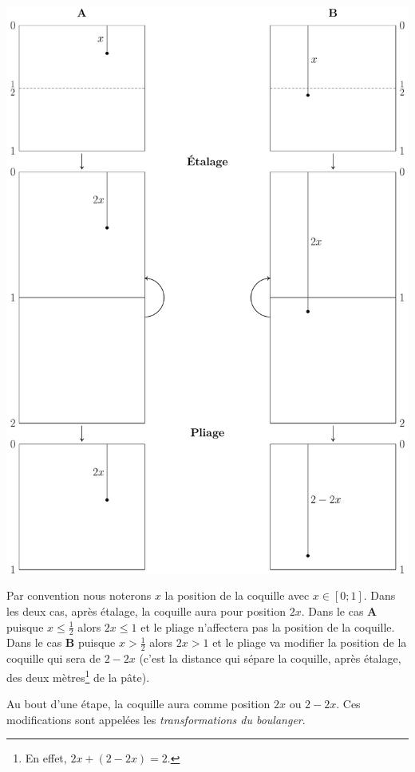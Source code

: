\documentclass[a4paper,french,12pt]{article}
\begin{document}
\begin{center}
\includegraphics[scale=0.45]{../TeXGraph/Pdf/visuel_2D_pate.pdf}
\end{center}

Par convention nous noterons $x$ la position de la coquille avec $x\in\left[0;1\right]$. Dans les deux cas, après étalage, la coquille aura pour position $2x$. Dans le cas \textbf{A} puisque $x\leqslant\frac{1}{2}$ alors $2x\leqslant1$ et le pliage n'affectera pas la position de la coquille. Dans le cas \textbf{B} puisque $x>\frac{1}{2}$ alors $2x>1$ et le pliage va modifier la position de la coquille qui sera de $2-2x$ (c'est la distance qui sépare la coquille, après étalage, des deux mètres\footnote{En effet, $2x+\left(2-2x\right)=2$.} de la pâte).

Au bout d'une étape, la coquille aura comme position $2x$ ou $2-2x$. Ces modifications sont appelées les \emph{transformations du boulanger}.
\end{document}
